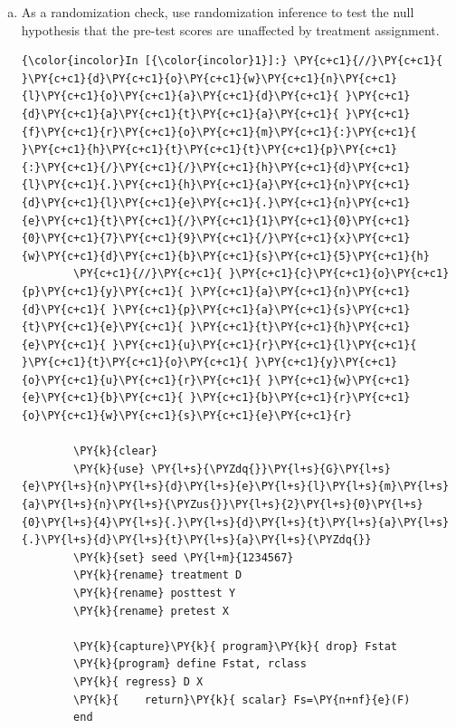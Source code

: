 \documentclass[11pt,notitlepage]{article}\usepackage[]{graphicx}\usepackage[]{color}
\makeatletter
\newenvironment{kframe}{%
 \def\at@end@of@kframe{}%
 \ifinner\ifhmode%
  \def\at@end@of@kframe{\end{minipage}}%
  \begin{minipage}{\columnwidth}%
 \fi\fi%
 \def\FrameCommand##1{\hskip\@totalleftmargin \hskip-\fboxsep
 \colorbox{shadecolor}{##1}\hskip-\fboxsep
     \hskip-\linewidth \hskip-\@totalleftmargin \hskip\columnwidth}%
 \MakeFramed {\advance\hsize-\width
   \@totalleftmargin\z@ \linewidth\hsize
   \@setminipage}}%
 {\par\unskip\endMakeFramed%
 \at@end@of@kframe}
\newenvironment{knitrout}{}{} %
\makeatother
\begin{document}
\begin{enumerate}[a)]
\item As a randomization check, use randomization inference to test the null hypothesis that the pre-test scores are unaffected by treatment assignment.

\begin{knitrout}
\color{fgcolor}\begin{kframe}
 \begin{Verbatim}[commandchars=\\\{\}]
{\color{incolor}In [{\color{incolor}1}]:} \PY{c+c1}{//}\PY{c+c1}{ }\PY{c+c1}{d}\PY{c+c1}{o}\PY{c+c1}{w}\PY{c+c1}{n}\PY{c+c1}{l}\PY{c+c1}{o}\PY{c+c1}{a}\PY{c+c1}{d}\PY{c+c1}{ }\PY{c+c1}{d}\PY{c+c1}{a}\PY{c+c1}{t}\PY{c+c1}{a}\PY{c+c1}{ }\PY{c+c1}{f}\PY{c+c1}{r}\PY{c+c1}{o}\PY{c+c1}{m}\PY{c+c1}{:}\PY{c+c1}{ }\PY{c+c1}{h}\PY{c+c1}{t}\PY{c+c1}{t}\PY{c+c1}{p}\PY{c+c1}{:}\PY{c+c1}{/}\PY{c+c1}{/}\PY{c+c1}{h}\PY{c+c1}{d}\PY{c+c1}{l}\PY{c+c1}{.}\PY{c+c1}{h}\PY{c+c1}{a}\PY{c+c1}{n}\PY{c+c1}{d}\PY{c+c1}{l}\PY{c+c1}{e}\PY{c+c1}{.}\PY{c+c1}{n}\PY{c+c1}{e}\PY{c+c1}{t}\PY{c+c1}{/}\PY{c+c1}{1}\PY{c+c1}{0}\PY{c+c1}{0}\PY{c+c1}{7}\PY{c+c1}{9}\PY{c+c1}{/}\PY{c+c1}{x}\PY{c+c1}{w}\PY{c+c1}{d}\PY{c+c1}{b}\PY{c+c1}{s}\PY{c+c1}{5}\PY{c+c1}{h}
        \PY{c+c1}{//}\PY{c+c1}{ }\PY{c+c1}{c}\PY{c+c1}{o}\PY{c+c1}{p}\PY{c+c1}{y}\PY{c+c1}{ }\PY{c+c1}{a}\PY{c+c1}{n}\PY{c+c1}{d}\PY{c+c1}{ }\PY{c+c1}{p}\PY{c+c1}{a}\PY{c+c1}{s}\PY{c+c1}{t}\PY{c+c1}{e}\PY{c+c1}{ }\PY{c+c1}{t}\PY{c+c1}{h}\PY{c+c1}{e}\PY{c+c1}{ }\PY{c+c1}{u}\PY{c+c1}{r}\PY{c+c1}{l}\PY{c+c1}{ }\PY{c+c1}{t}\PY{c+c1}{o}\PY{c+c1}{ }\PY{c+c1}{y}\PY{c+c1}{o}\PY{c+c1}{u}\PY{c+c1}{r}\PY{c+c1}{ }\PY{c+c1}{w}\PY{c+c1}{e}\PY{c+c1}{b}\PY{c+c1}{ }\PY{c+c1}{b}\PY{c+c1}{r}\PY{c+c1}{o}\PY{c+c1}{w}\PY{c+c1}{s}\PY{c+c1}{e}\PY{c+c1}{r}
        
        \PY{k}{clear}
        \PY{k}{use} \PY{l+s}{\PYZdq{}}\PY{l+s}{G}\PY{l+s}{e}\PY{l+s}{n}\PY{l+s}{d}\PY{l+s}{e}\PY{l+s}{l}\PY{l+s}{m}\PY{l+s}{a}\PY{l+s}{n}\PY{l+s}{\PYZus{}}\PY{l+s}{2}\PY{l+s}{0}\PY{l+s}{0}\PY{l+s}{4}\PY{l+s}{.}\PY{l+s}{d}\PY{l+s}{t}\PY{l+s}{a}\PY{l+s}{.}\PY{l+s}{d}\PY{l+s}{t}\PY{l+s}{a}\PY{l+s}{\PYZdq{}}
        \PY{k}{set} seed \PY{l+m}{1234567}
        \PY{k}{rename} treatment D
        \PY{k}{rename} posttest Y
        \PY{k}{rename} pretest X
        
        \PY{k}{capture}\PY{k}{ program}\PY{k}{ drop} Fstat
        \PY{k}{program} define Fstat, rclass
        \PY{k}{	regress} D X
        \PY{k}{    return}\PY{k}{ scalar} Fs=\PY{n+nf}{e}(F)
        end
        

\end{Verbatim}
\end{kframe}
\end{knitrout}
\end{enumerate}
\end{document}
